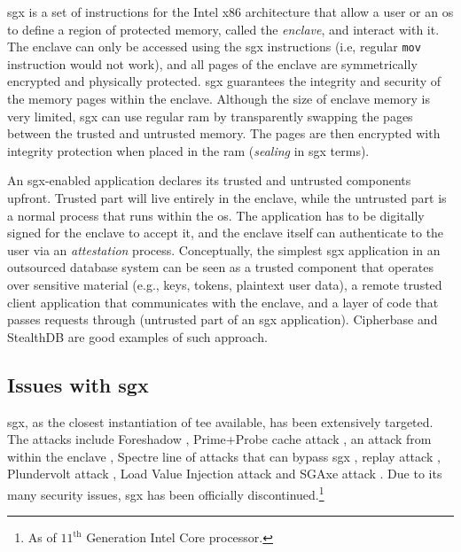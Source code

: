 			\acrfull{sgx} is a set of instructions for the Intel x86 architecture that allow a user or an \acrlong{os} to define a region of protected memory, called the \emph{enclave}, and interact with it.
			The enclave can only be accessed using the \acrshort{sgx} instructions (i.e, regular \texttt{mov} instruction would not work), and all pages of the enclave are symmetrically encrypted and physically protected.
			\acrshort{sgx} guarantees the integrity and security of the memory pages within the enclave.
			Although the size of enclave memory is very limited, \acrshort{sgx} can use regular \acrshort{ram} by transparently swapping the pages between the trusted and untrusted memory.
			The pages are then encrypted with integrity protection when placed in the \acrshort{ram} (\emph{sealing} in \acrshort{sgx} terms).

			An \acrshort{sgx}-enabled application declares its trusted and untrusted components upfront.
			Trusted part will live entirely in the enclave, while the untrusted part is a normal process that runs within the \acrshort{os}.
			The application has to be digitally signed for the enclave to accept it, and the enclave itself can authenticate to the user via an \emph{attestation} process.
			Conceptually, the simplest \acrshort{sgx} application in an outsourced database system can be seen as a trusted component that operates over sensitive material (e.g., keys, tokens, plaintext user data), a remote trusted client application that communicates with the enclave, and a layer of code that passes requests through (untrusted part of an \acrshort{sgx} application).
			Cipherbase \cite{cipherbase-daas} and StealthDB \cite{stealth-db} are good examples of such approach.

		\subsection{Issues with \acrshort{sgx}}

			\acrshort{sgx}, as the closest instantiation of \acrshort{tee} available, has been extensively targeted.
			The attacks include Foreshadow \cite{foreshadow}, Prime+Probe cache attack \cite{prime-probe-sgx-attack}, an attack from within the enclave \cite{enclave-sgx-attack}, Spectre line of attacks that can bypass \acrshort{sgx} \cite{spectre-sgx-attack}, replay attack \cite{replay-sgx-attack}, Plundervolt attack \cite{plundervolt-sgx-attack}, Load Value Injection attack \cite{lvi-sgx-attack} and SGAxe attack \cite{sgaxe-sgx-attack}.
			Due to its many security issues, \acrshort{sgx} has been officially discontinued.\footnote{As of $11^\text{th}$ Generation Intel Core processor.}

